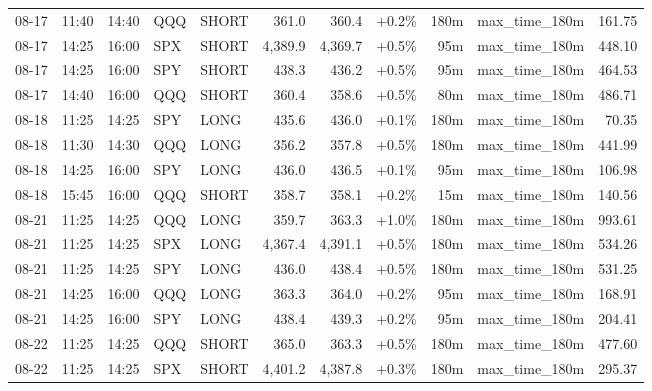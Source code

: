 \documentclass[11pt,a4paper,twoside]{article}
\begin{document}
\begin{center}
\begin{longtable}{>{\color{txtmain}}l l l l l r r r r >{\color{txtmain}}l r}
08-17 & 11:40 & 14:40 & QQQ & SHORT & 361.0 & 360.4 & \textcolor{wingreen}{+0.2\%} & 180m & max\_time\_180m & \textcolor{wingreen}{161.75} \\
08-17 & 14:25 & 16:00 & SPX & SHORT & 4,389.9 & 4,369.7 & \textcolor{wingreen}{+0.5\%} & 95m & max\_time\_180m & \textcolor{wingreen}{448.10} \\
08-17 & 14:25 & 16:00 & SPY & SHORT & 438.3 & 436.2 & \textcolor{wingreen}{+0.5\%} & 95m & max\_time\_180m & \textcolor{wingreen}{464.53} \\
08-17 & 14:40 & 16:00 & QQQ & SHORT & 360.4 & 358.6 & \textcolor{wingreen}{+0.5\%} & 80m & max\_time\_180m & \textcolor{wingreen}{486.71} \\
08-18 & 11:25 & 14:25 & SPY & LONG & 435.6 & 436.0 & \textcolor{wingreen}{+0.1\%} & 180m & max\_time\_180m & \textcolor{wingreen}{70.35} \\
08-18 & 11:30 & 14:30 & QQQ & LONG & 356.2 & 357.8 & \textcolor{wingreen}{+0.5\%} & 180m & max\_time\_180m & \textcolor{wingreen}{441.99} \\
08-18 & 14:25 & 16:00 & SPY & LONG & 436.0 & 436.5 & \textcolor{wingreen}{+0.1\%} & 95m & max\_time\_180m & \textcolor{wingreen}{106.98} \\
08-18 & 15:45 & 16:00 & QQQ & SHORT & 358.7 & 358.1 & \textcolor{wingreen}{+0.2\%} & 15m & max\_time\_180m & \textcolor{wingreen}{140.56} \\
08-21 & 11:25 & 14:25 & QQQ & LONG & 359.7 & 363.3 & \textcolor{wingreen}{+1.0\%} & 180m & max\_time\_180m & \textcolor{wingreen}{993.61} \\
08-21 & 11:25 & 14:25 & SPX & LONG & 4,367.4 & 4,391.1 & \textcolor{wingreen}{+0.5\%} & 180m & max\_time\_180m & \textcolor{wingreen}{534.26} \\
08-21 & 11:25 & 14:25 & SPY & LONG & 436.0 & 438.4 & \textcolor{wingreen}{+0.5\%} & 180m & max\_time\_180m & \textcolor{wingreen}{531.25} \\
08-21 & 14:25 & 16:00 & QQQ & LONG & 363.3 & 364.0 & \textcolor{wingreen}{+0.2\%} & 95m & max\_time\_180m & \textcolor{wingreen}{168.91} \\
08-21 & 14:25 & 16:00 & SPY & LONG & 438.4 & 439.3 & \textcolor{wingreen}{+0.2\%} & 95m & max\_time\_180m & \textcolor{wingreen}{204.41} \\
08-22 & 11:25 & 14:25 & QQQ & SHORT & 365.0 & 363.3 & \textcolor{wingreen}{+0.5\%} & 180m & max\_time\_180m & \textcolor{wingreen}{477.60} \\
08-22 & 11:25 & 14:25 & SPX & SHORT & 4,401.2 & 4,387.8 & \textcolor{wingreen}{+0.3\%} & 180m & max\_time\_180m & \textcolor{wingreen}{295.37} \\

\end{longtable}
\end{center}
\end{document}
